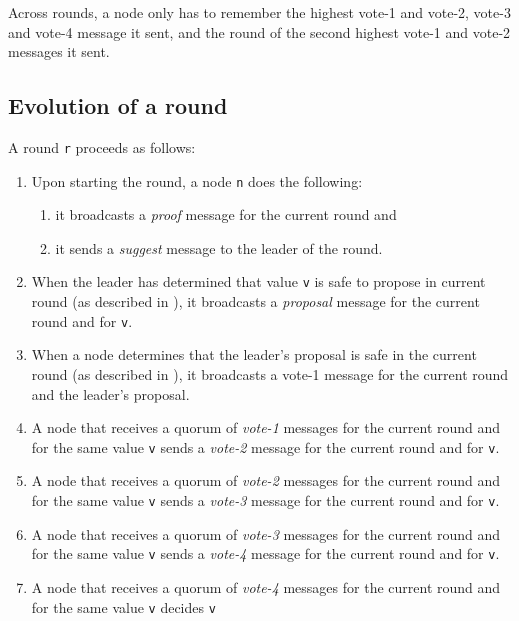 \documentclass[11pt]{article}
\begin{document}
Across rounds, a node only has to remember the highest vote-1 and vote-2,
vote-3 and vote-4 message it sent, and the round of the second highest vote-1
and vote-2 messages it sent.

\subsection{Evolution of a round}

A round \texttt{r} proceeds as follows:
\begin{enumerate}
  \item Upon starting the round, a node \texttt{n} does the following:
    \begin{enumerate}
      \item it broadcasts a \textit{proof} message for the current round and
      \item it sends a \textit{suggest} message to the leader of the round.
    \end{enumerate}
  \item When the leader has determined that value \texttt{v} is safe to propose
    in current round (as described in ), it broadcasts a
    \textit{proposal} message for the current round and for \texttt{v}.
  \item When a node determines that the leader's proposal is safe in the
    current round (as described in ), it broadcasts a vote-1
    message for the current round and the leader's proposal.
    \item A node that receives a quorum of \textit{vote-1} messages for the
      current round and for the same value \texttt{v} sends a \textit{vote-2}
      message for the current round and for \texttt{v}.
    \item A node that receives a quorum of \textit{vote-2} messages for the
      current round and for the same value \texttt{v} sends a \textit{vote-3}
      message for the current round and for \texttt{v}.
    \item A node that receives a quorum of \textit{vote-3} messages for the
      current round and for the same value \texttt{v} sends a \textit{vote-4}
      message for the current round and for \texttt{v}.
    \item A node that receives a quorum of \textit{vote-4} messages for the
      current round and for the same value \texttt{v} decides \texttt{v}
\end{enumerate}
\end{document}
